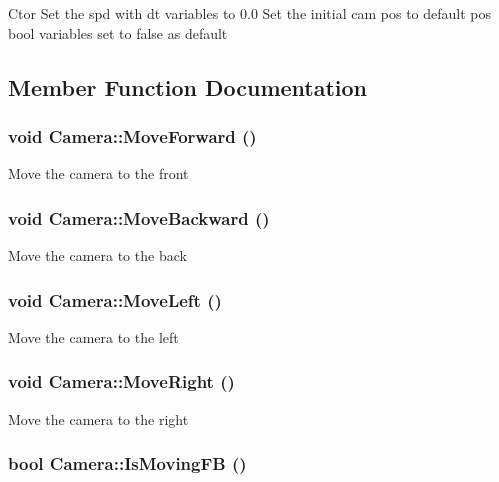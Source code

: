 Ctor Set the spd with dt variables to 0.0 Set the initial cam pos to default pos bool variables set to false as default 

\subsection{Member Function Documentation}
\hypertarget{class_camera_00bd495b8f247ac7a9e5de1fd1866bef}{
\subsubsection[MoveForward]{\setlength{\rightskip}{0pt plus 5cm}void Camera::MoveForward ()}}
\label{class_camera_00bd495b8f247ac7a9e5de1fd1866bef}


Move the camera to the front \hypertarget{class_camera_3ee9d79d50ebf1c365c2558ae4a5ea70}{
\subsubsection[MoveBackward]{\setlength{\rightskip}{0pt plus 5cm}void Camera::MoveBackward ()}}
\label{class_camera_3ee9d79d50ebf1c365c2558ae4a5ea70}


Move the camera to the back \hypertarget{class_camera_bbc8e3c66029cd2adbd59c64ab8e3b25}{
\subsubsection[MoveLeft]{\setlength{\rightskip}{0pt plus 5cm}void Camera::MoveLeft ()}}
\label{class_camera_bbc8e3c66029cd2adbd59c64ab8e3b25}


Move the camera to the left \hypertarget{class_camera_497ed87c48b0a09e25dc3adb9ee31ec7}{
\subsubsection[MoveRight]{\setlength{\rightskip}{0pt plus 5cm}void Camera::MoveRight ()}}
\label{class_camera_497ed87c48b0a09e25dc3adb9ee31ec7}


Move the camera to the right \hypertarget{class_camera_190d48b772eeea0547285db6b4f6a6fe}{
\subsubsection[IsMovingFB]{\setlength{\rightskip}{0pt plus 5cm}bool Camera::IsMovingFB ()}}
\label{class_camera_190d48b772eeea0547285db6b4f6a6fe}


